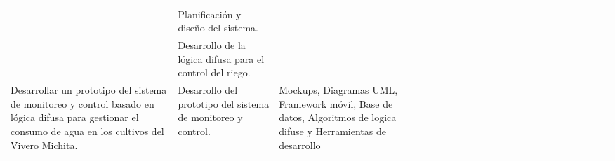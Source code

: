 \begin{landscape}
\begin{ThreePartTable}
\begin{longtable}{|p{}|p{5.5cm}|p{5.5cm}|l|l|l|l|l|l|l|l|l|l|l|l|l|l|l|l|l|l|l|}
      \hline                                                                                                                                                                                   & Planificación y diseño del sistema.                                                        &                                                                                                                  &                                       &                                       &                                      &                                       & \cellcolor{magenta!70} & \cellcolor{magenta!70} &                        &                        &                        &                        &                        &                        &                        &                        &                        \\
      \cline{2-2}\cline{4-21}
                                                                                                                                                                                               & Desarrollo de la lógica difusa para el control del riego.                                  &                                                                                                                  &                                       &                                       &                                      &                                       &                        &                        & \cellcolor{magenta!70} & \cellcolor{magenta!70} &                        &                        &                        &                        &                        &                        &                        \\
      \cline{2-2}\cline{4-21}
      \multirow{4}{0.28 \textwidth}{Desarrollar un prototipo del sistema de monitoreo y control basado en lógica difusa para gestionar el consumo de agua en los cultivos del Vivero Michita.} & Desarrollo del prototipo del sistema de monitoreo y control.                               & Mockups, Diagramas UML, Framework móvil, Base de datos, Algoritmos de logica difuse y Herramientas de desarrollo &                                       &                                       &                                      &                                       &                        &                        &                        &                        & \cellcolor{magenta!70} & \cellcolor{magenta!70} & \cellcolor{magenta!70} &                        &                        &                        &                        \\

\end{longtable}
\end{ThreePartTable}
\end{landscape}
